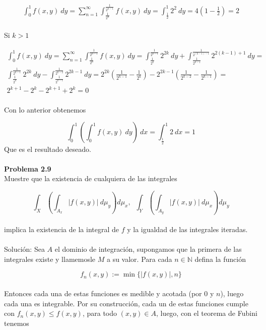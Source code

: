\documentclass[12pt]{article}
\begin{document}
    \begin{gather*}
        \int_0^1f(x,y)\:dy = 
        \sum_{n=1}^{\infty}\int_{\frac{1}{2^{n}}}^{\frac{1}{2^{n-1}}}f(x,y)\:dy =
        \int_{\frac{1}{2}}^1 2^2\:dy =
        4(1-\frac{1}{2})=2
    \end{gather*}
    \\
    Si $k>1$

    \begin{gather*}
        \int_0^1f(x,y)\:dy = 
        \sum_{n=1}^{\infty}\int_{\frac{1}{2^{n}}}^{\frac{1}{2^{n-1}}}f(x,y)\:dy = 
        \int_{\frac{1}{2^{k}}}^{\frac{1}{2^{k-1}}}2^{2k}\:dy + \int_{\frac{1}{2^{k-1}}}^{\frac{1}{2^{(k-1)-1}}}2^{2(k-1)+1}\:dy = \\
        \int_{\frac{1}{2^{k}}}^{\frac{1}{2^{k-1}}}2^{2k}\:dy - \int_{\frac{1}{2^{k-1}}}^{\frac{1}{2^{k-2}}}2^{2k-1}\:dy =
        2^{2k}\left(\frac{1}{2^{k-1}}-\frac{1}{2^{k}}\right) - 2^{2k-1}\left(\frac{1}{2^{k-2}}-\frac{1}{2^{k-1}}\right) = \\
        2^{k+1}-2^k-2^{k+1}+2^k = 0
    \end{gather*}
    \\
    Con lo anterior obtenemos 

    \[\int_0^1\left(\int_0^1 f(x,y)\:dy\right)\:dx = \int_{\frac{1}{2}}^1 2\:dx = 1\]
    Que es el resultado deseado.
    \\ \\

    \textbf{Problema 2.9} \\

    Muestre que la existencia de cualquiera de las integrales

    \[\int_X \left(\int_{A_x}|f(x,y)|\:d\mu_{y}\right)d\mu_x, \; \; \int_Y \left(\int_{A_y}|f(x,y)|\:d\mu_{x}\right)d\mu_y\]
    \\
    implica la existencia de la integral de $f$ y la igualdad de las integrales iteradas.
    \\ \\
    Soluci\'on:
    Sea $A$ el dominio de integraci\'on, supongamos que la primera de las integrales existe y 
    llamemosle $M$ a su valor. Para cada $n\in \mathbb{N}$ defina la funci\'on 

    \[f_n(x,y):=\min\{|f(x,y)|,n\}\]
    \\
    Entonces cada una de estas funciones es medible y acotada (por $0$ y $n$), luego cada una es integrable. 
    Por su construcci\'on, cada un de estas funciones cumple con $f_n(x,y) \leq f(x,y)$, para 
    todo $(x,y)\in A$, luego, con el teorema de Fubini tenemos
\end{document}
